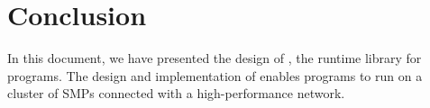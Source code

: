 \section{Conclusion}

In this document, we have presented the design of \Xtenlib{}, the
runtime library for \Xten{} programs. The design and implementation of
\Xtenlib{} enables \Xten{} programs to run on a cluster of SMPs
connected with a high-performance network.

